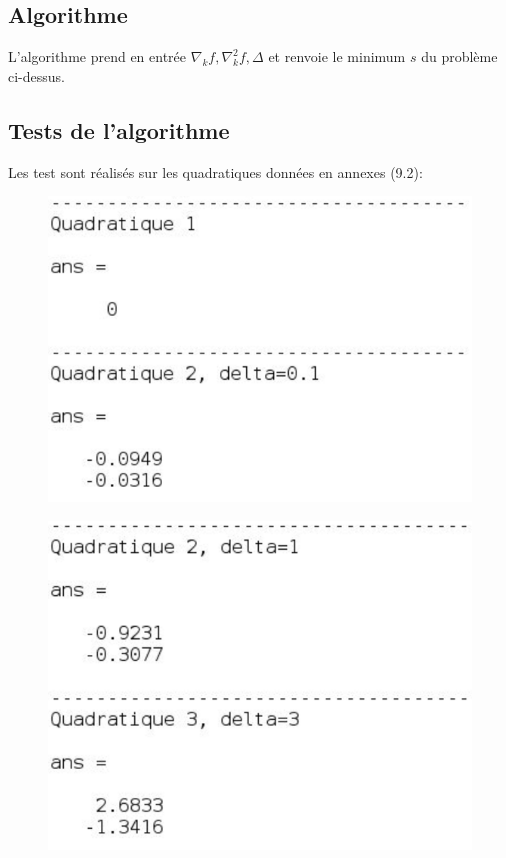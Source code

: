 \documentclass[a4paper,12pt]{article}
\theoremstyle{break}
\begin{document}
\subsection{Algorithme}

L'algorithme prend en entrée $\nabla_k f, \nabla^2_k f, \Delta$ et renvoie le minimum $s$ du problème ci-dessus.


\subsection{Tests de l'algorithme}
Les test sont réalisés sur les quadratiques données en annexes (9.2):
\begin{figure}[htbp]
	\centering
		\includegraphics{img/test1_pas_cauchy.PNG}
\end{figure}
\begin{figure}[htbp]
	\centering
		\includegraphics{img/test2_pas_cauchy.PNG}
\end{figure}
\end{document}

